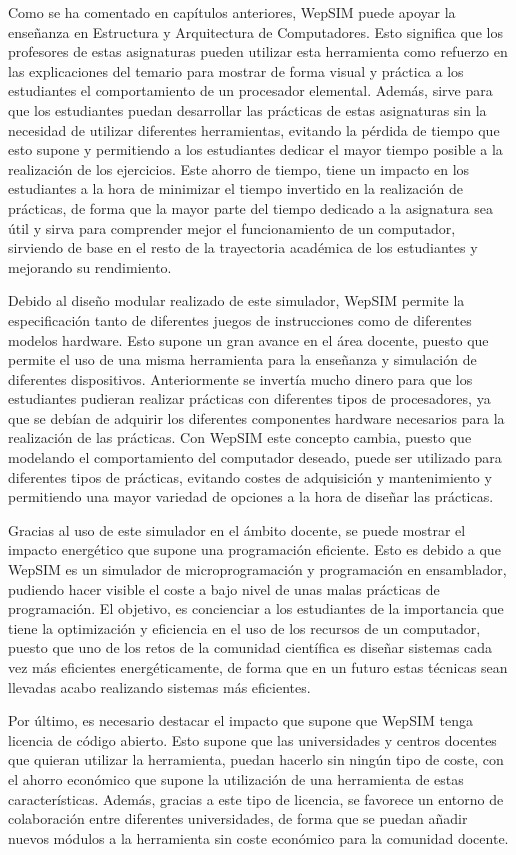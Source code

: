 Como se ha comentado en capítulos anteriores, WepSIM puede apoyar la enseñanza en Estructura y Arquitectura de Computadores. Esto significa que los profesores de estas asignaturas pueden utilizar esta herramienta como refuerzo en las explicaciones del temario para mostrar de forma visual y práctica a los estudiantes el comportamiento de un procesador elemental. Además, sirve para que los estudiantes puedan desarrollar las prácticas de estas asignaturas sin la necesidad de utilizar diferentes herramientas, evitando la pérdida de tiempo que esto supone y permitiendo a los estudiantes dedicar el mayor tiempo posible a la realización de los ejercicios. Este ahorro de tiempo, tiene un impacto en los estudiantes a la hora de minimizar el tiempo invertido en la realización de prácticas, de forma que la mayor parte del tiempo dedicado a la asignatura sea útil y sirva para comprender mejor el funcionamiento de un computador, sirviendo de base en el resto de la trayectoria académica de los estudiantes y mejorando su rendimiento.

Debido al diseño modular realizado de este simulador, WepSIM permite la especificación tanto de diferentes juegos de instrucciones como de diferentes modelos hardware. Esto supone un gran avance  en el área docente, puesto que permite el uso de una misma herramienta para la enseñanza y simulación de diferentes dispositivos. Anteriormente se invertía mucho dinero para que los estudiantes pudieran realizar prácticas con diferentes tipos de procesadores, ya que se debían de adquirir los diferentes componentes hardware necesarios para la realización de las prácticas. Con WepSIM este concepto cambia, puesto que modelando el comportamiento del computador deseado, puede ser utilizado para diferentes tipos de prácticas, evitando costes de adquisición y mantenimiento y permitiendo una mayor variedad de opciones a la hora de diseñar las prácticas.

Gracias al uso de este simulador en el ámbito docente, se puede mostrar el impacto energético que supone una programación eficiente. Esto es debido a que WepSIM es un simulador de microprogramación y programación en ensamblador, pudiendo hacer visible el coste a bajo nivel de unas malas prácticas de programación. El objetivo, es concienciar a los estudiantes de la importancia que tiene la optimización y eficiencia en el uso de los recursos de un computador, puesto que uno de los retos de la comunidad científica es diseñar sistemas cada vez más eficientes energéticamente, de forma que en un futuro estas técnicas sean llevadas acabo realizando sistemas más eficientes.

Por último, es necesario destacar el impacto que supone que WepSIM tenga licencia de código abierto. Esto supone que las universidades y centros docentes que quieran utilizar la herramienta, puedan hacerlo sin ningún tipo de coste, con el ahorro económico que supone la utilización de una herramienta de estas características. Además, gracias a este tipo de licencia, se favorece un entorno de colaboración entre diferentes universidades, de forma que se puedan añadir nuevos módulos a la herramienta sin coste económico para la comunidad docente.

